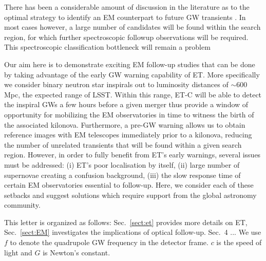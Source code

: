 \documentclass{aa}
\begin{document}
There has been a considerable amount of discussion in the literature as to the optimal strategy to identify an EM counterpart to future GW transients \citep{2016ApJ...820..136G, 2011MNRAS.415L..26C, 2016A&A...592A..82G, 2017ApJ...834...84C, 2014MNRAS.437..649S, 2016MNRAS.462.1085A}. In most cases however, a large number of candidates will be found within the search region, for which further spectroscopic followup observations will be required. This spectroscopic classification bottleneck will remain a problem


Our aim here is to demonstrate exciting EM follow-up studies that can be done by taking advantage of the early GW warning capability of ET. More specifically we
consider binary neutron star inspirals
out to luminosity distances of $\sim 600\,$Mpc, 
the expected range of LSST. Within this range,
ET-C will be able to detect the inspiral GWs
a few hours before a given merger thus provide
a window of opportunity for mobilizing the EM
observatories in time to witness the birth of 
the associated kilonova. Furthermore, a pre-GW warning allows us to 
obtain reference images with EM telescopes immediately prior to a kilonova, reducing the number
of unrelated transients that will be found within a given search region.
However, in order to
fully benefit from ET's early warnings, several
issues must be addressed: (i) ET's poor localisation by itself, (ii) large number of 
supernovae creating a confusion background, 
(iii) the slow response time of certain EM 
observatories essential to follow-up. %
Here, we consider each of these setbacks and
suggest solutions which require support from the global astronomy community.

This letter is organized as follows: Sec.~\ref{sect:et} provides more details on ET,
Sec.~\ref{sect:EM} investigates the implications
of optical follow-up. Sec.~4 ...
We use $f$ to denote the quadrupole GW frequency
in the detector frame. $c$ is the speed of light and $G$ is Newton's constant.
\end{document}
